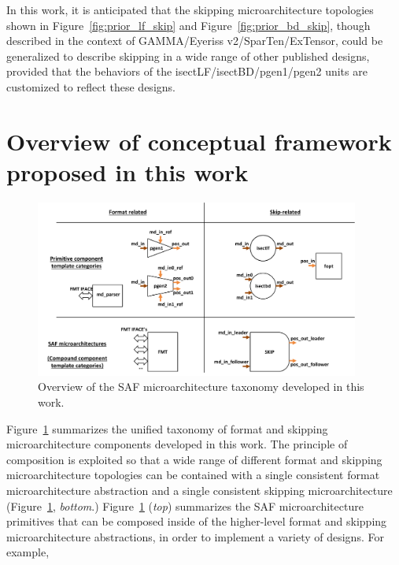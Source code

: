 In this work, it is anticipated that the skipping microarchitecture topologies shown in Figure~\ref{fig:prior_lf_skip} and Figure~\ref{fig:prior_bd_skip}, though described in the context of GAMMA\cite{gamma}/Eyeriss v2\cite{eyerissv2}/SparTen\cite{sparten}/ExTensor\cite{extensor}, could be generalized to describe skipping in a wide range of other published designs, provided that the behaviors of the isectLF/isectBD/pgen1/pgen2 units are customized to reflect these designs.

\section{Overview of conceptual framework proposed in this work}

\begin{figure}[ht]
    \centering
    \includegraphics[width=0.95\textwidth]{figures/this_work_taxo.pdf}
    \caption{Overview of the SAF microarchitecture taxonomy developed in this work.}
    \label{fig:this_work_taxo}
\end{figure}

Figure~\ref{fig:this_work_taxo} summarizes the unified taxonomy of format and skipping microarchitecture components developed in this work. The principle of composition is exploited so that a wide range of different format and skipping microarchitecture topologies can be contained with a single consistent format microarchitecture abstraction and a single consistent skipping microarchitecture (Figure~\ref{fig:this_work_taxo}, \textit{bottom}.) Figure~\ref{fig:this_work_taxo} (\textit{top}) summarizes the SAF microarchitecture primitives that can be composed inside of the higher-level format and skipping microarchitecture abstractions, in order to implement a variety of designs. For example,

